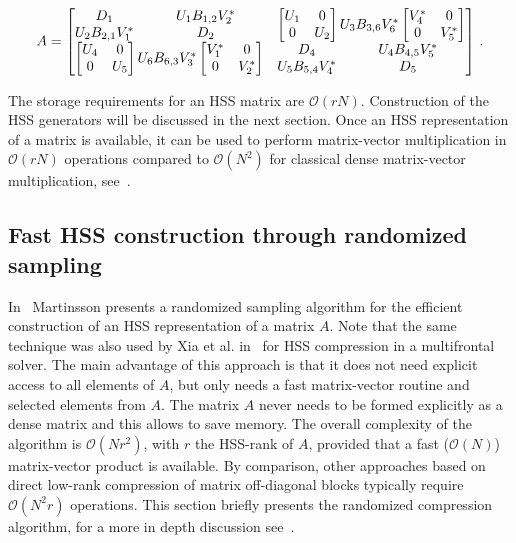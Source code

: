\documentclass{article}
\begin{document}
\begin{equation}
A = \begin{bmatrix}
    D_1 & U_1 B_{1,2} V_2^* & \multicolumn{2}{c}{\multirow{2}{*}{$\begin{bmatrix} U_1 & 0 \\ 0 & U_2 \end{bmatrix} U_3 B_{3,6} V_6^* \begin{bmatrix} V_4^* & 0 \\ 0 & V_5^* \end{bmatrix}$}} \\
    U_2 B_{2,1} V_1^* & D_2 &  \\
    \multicolumn{2}{c}{\multirow{2}{*}{$\begin{bmatrix} U_4 & 0 \\ 0 & U_5 \end{bmatrix} U_6 B_{6,3} V_3^* \begin{bmatrix} V_1^* & 0 \\ 0 & V_2^* \end{bmatrix}$}} 
    & D_4 & U_4 B_{4,5} V_5^* \\
      & & U_5 B_{5,4} V_4^* & D_5
    \end{bmatrix} \, .
    \label{eq:HSSexamplematrix}
\end{equation}

The storage requirements for an HSS matrix are
$\mathcal{O}(rN)$. Construction of the HSS generators will be
discussed in the next section. Once an HSS representation of a matrix
is available, it can be used to perform matrix-vector multiplication
in $\mathcal{O}(rN)$ operations compared to $\mathcal{O}(N^2)$ for
classical dense matrix-vector multiplication,
see~\cite{martinsson2011fast,FHR}.








\subsection{Fast HSS construction through randomized sampling}\label{sec:HSSconstruction}
In~\cite{martinsson2011fast} Martinsson presents a randomized sampling
algorithm for the efficient construction of an HSS representation of a
matrix $A$. Note that the same technique was also used by Xia et
al. in~\cite{xia2012superfast,xia2013randomized} for HSS compression
in a multifrontal solver. The main advantage of this approach is that
it does not need explicit access to all elements of $A$, but only
needs a fast matrix-vector routine and selected elements from $A$. The
matrix $A$ never needs to be formed explicitly as a dense matrix and
this allows to save memory. The overall complexity of the algorithm is
$\mathcal{O}(N r^2)$, with $r$ the HSS-rank of $A$, provided that a
fast ($\mathcal{O}(N)$) matrix-vector product is available. By
comparison, other approaches based on direct low-rank compression of
matrix off-diagonal blocks typically require $\mathcal{O}(N^2 r)$
operations. This section briefly presents the randomized compression
algorithm, for a more in depth discussion
see~\cite{FHR,martinsson2011fast}.
\end{document}

